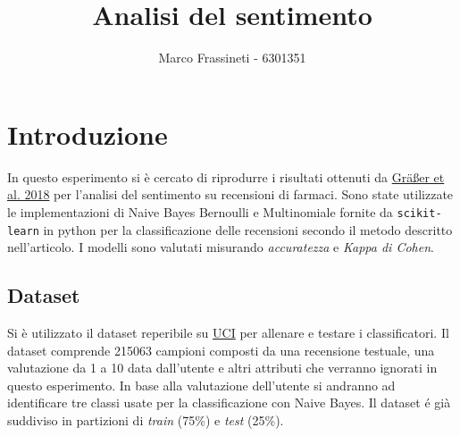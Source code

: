\documentclass{article}
\title{Analisi del sentimento}
\author{Marco Frassineti - 6301351}
\date{}
\begin{document}
\maketitle

\tableofcontents

\section{Introduzione}
In questo esperimento si è cercato di riprodurre i risultati ottenuti da
\href{http://kdd.cs.ksu.edu/Publications/Student/kallumadi2018aspect.pdf}{Gräßer et al. 2018}
per l'analisi del sentimento su recensioni di farmaci. Sono state utilizzate le implementazioni
di Naive Bayes Bernoulli e Multinomiale fornite da \texttt{scikit-learn} in python
per la classificazione delle recensioni secondo il metodo descritto nell'articolo.
I modelli sono valutati misurando \textit{accuratezza} e \textit{Kappa di Cohen}.

\subsection{Dataset}
Si è utilizzato il dataset reperibile su
\href{https://archive.ics.uci.edu/ml/datasets/Drug+Review+Dataset+%28Drugs.com%29}{UCI}
per allenare e testare i classificatori. Il dataset comprende 215063 campioni composti da
una recensione testuale, una valutazione da 1 a 10 data dall'utente e altri attributi che
verranno ignorati in questo esperimento.
In base alla valutazione dell'utente si andranno ad identificare tre classi usate per
la classificazione con Naive Bayes.
Il dataset é già suddiviso in partizioni di \textit{train} (75\%) e \textit{test} (25\%).
\end{document}

